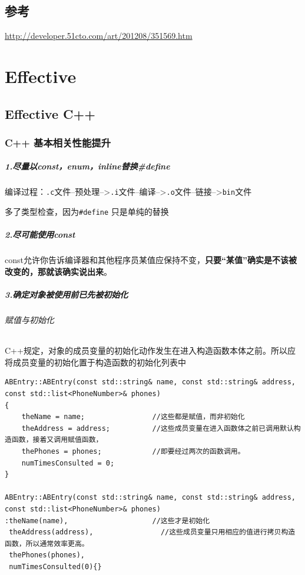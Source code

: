\documentclass[UTF8,a4paper,12pt]{ctexbook}
\begin{document}
\section{参考}\url{http://developer.51cto.com/art/201208/351569.htm}    

\chapter{Effective}
	\section{Effective C++}
		\subsection{C++ 基本相关性能提升}
		\paragraph{1.尽量以const，enum，inline替换\#define} 编译过程：\verb|.c|文件--预处理-->\verb|.i|文件--编译-->\verb|.o|文件--链接-->\verb|bin|文件
		
		多了类型检查，因为\verb|#define| 只是单纯的替换
		\paragraph{2.尽可能使用const} const允许你告诉编译器和其他程序员某值应保持不变，\textbf{只要“某值”确实是不该被改变的，那就该确实说出来}。
		\paragraph{3.确定对象被使用前已先被初始化}
			\subparagraph{赋值与初始化} C++规定，对象的成员变量的初始化动作发生在进入构造函数本体之前。所以应将成员变量的初始化置于构造函数的初始化列表中
			
			\begin{lstlisting}
ABEntry::ABEntry(const std::string& name, const std::string& address,
const std::list<PhoneNumber>& phones)
{ 
	theName = name;                //这些都是赋值，而非初始化
	theAddress = address;          //这些成员变量在进入函数体之前已调用默认构造函数，接着又调用赋值函数，
	thePhones = phones;            //即要经过两次的函数调用。            
	numTimesConsulted = 0;
} 
	 
ABEntry::ABEntry(const std::string& name, const std::string& address,
const std::list<PhoneNumber>& phones) 
:theName(name),                    //这些才是初始化 
 theAddress(address),                //这些成员变量只用相应的值进行拷贝构造函数，所以通常效率更高。
 thePhones(phones),
 numTimesConsulted(0){} 
			\end{lstlisting}
				
\end{document}
